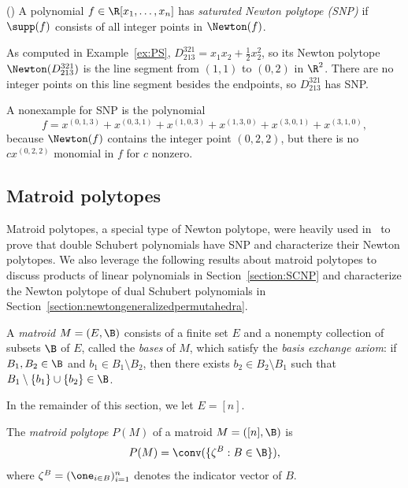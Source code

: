 \begin{defi}(\cite{NewtonPolyinAC})
    A polynomial $f \in \R[x_1, \dots, x_n]$ has \emph{saturated Newton polytope (SNP)} if $\supp(f)$ consists of all integer points in $\Newton(f)$.    
\end{defi}
\begin{exam}\label{ex:snp}
    As computed in Example~\ref{ex:PS}, $D_{213}^{321} = x_1x_2+\frac{1}{2}x_2^2$, so its Newton polytope $\Newton(D_{213}^{321})$ is the line segment from $(1, 1)$ to $(0, 2)$ in $\R^2$. There are no integer points on this line segment besides the endpoints, so $D_{213}^{321}$ has SNP.
\end{exam}

\begin{rema}
    A nonexample for SNP is the polynomial
    \[f = x^{(0, 1, 3)} + x^{(0,3,1)} + x^{(1,0,3)} + x^{(1,3,0)} + x^{(3,0,1)} + x^{(3,1,0)},\] 
    because $\Newton(f)$ contains the integer point $(0, 2, 2)$, but there is no $cx^{(0, 2, 2)}$ monomial in $f$ for $c$ nonzero.
\end{rema}

\subsection{Matroid polytopes}\label{section:matroidpolytopes}

Matroid polytopes, a special type of Newton polytope, were heavily used in~\cite{DoubleSchSNP} to prove that double Schubert polynomials have SNP and characterize their Newton polytopes. We also leverage the following results about matroid polytopes to discuss products of linear polynomials in Section~\ref{section:SCNP} and characterize the Newton polytope of dual Schubert polynomials in Section~\ref{section:newtongeneralizedpermutahedra}.

\begin{defi}
    A \emph{matroid} $M = (E, \B)$ consists of a finite set $E$ and a nonempty collection of subsets $\B$ of $E$, called the \emph{bases} of $M$, which satisfy the \emph{basis exchange axiom}: if $B_1, B_2\in \B$ and $b_1\in B_1 \setminus B_2$, then there exists $b_2\in B_2 \setminus B_1$ such that $B_1 \setminus \{b_1\}\cup \{b_2\}\in \B$.
\end{defi}

In the remainder of this section, we let $E = [n]$.

\begin{defi}
    The \emph{matroid polytope} $P(M)$ of a matroid $M = ([n], \B)$ is 
    \[P(M) = \conv(\{\zeta^B : B\in \B\}),\]
    where $\zeta^B = (\one_{i\in B})_{i=1}^n$ denotes the indicator vector of $B$.
\end{defi}

